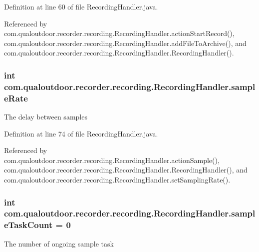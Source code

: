 Definition at line 60 of file Recording\-Handler.\-java.



Referenced by com.\-qualoutdoor.\-recorder.\-recording.\-Recording\-Handler.\-action\-Start\-Record(), com.\-qualoutdoor.\-recorder.\-recording.\-Recording\-Handler.\-add\-File\-To\-Archive(), and com.\-qualoutdoor.\-recorder.\-recording.\-Recording\-Handler.\-Recording\-Handler().

\hypertarget{classcom_1_1qualoutdoor_1_1recorder_1_1recording_1_1RecordingHandler_ada90cb2be34fabadd3ba906554dff109}{
\subsubsection[{sample\-Rate}]{\setlength{\rightskip}{0pt plus 5cm}int com.\-qualoutdoor.\-recorder.\-recording.\-Recording\-Handler.\-sample\-Rate\hspace{0.3cm}{\ttfamily [private]}}}\label{classcom_1_1qualoutdoor_1_1recorder_1_1recording_1_1RecordingHandler_ada90cb2be34fabadd3ba906554dff109}
The delay between samples 

Definition at line 74 of file Recording\-Handler.\-java.



Referenced by com.\-qualoutdoor.\-recorder.\-recording.\-Recording\-Handler.\-action\-Sample(), com.\-qualoutdoor.\-recorder.\-recording.\-Recording\-Handler.\-Recording\-Handler(), and com.\-qualoutdoor.\-recorder.\-recording.\-Recording\-Handler.\-set\-Sampling\-Rate().

\hypertarget{classcom_1_1qualoutdoor_1_1recorder_1_1recording_1_1RecordingHandler_a80d3016579fbb54ff9b82e05a7819080}{
\subsubsection[{sample\-Task\-Count}]{\setlength{\rightskip}{0pt plus 5cm}int com.\-qualoutdoor.\-recorder.\-recording.\-Recording\-Handler.\-sample\-Task\-Count = 0\hspace{0.3cm}{\ttfamily [private]}}}\label{classcom_1_1qualoutdoor_1_1recorder_1_1recording_1_1RecordingHandler_a80d3016579fbb54ff9b82e05a7819080}
The number of ongoing sample task 

